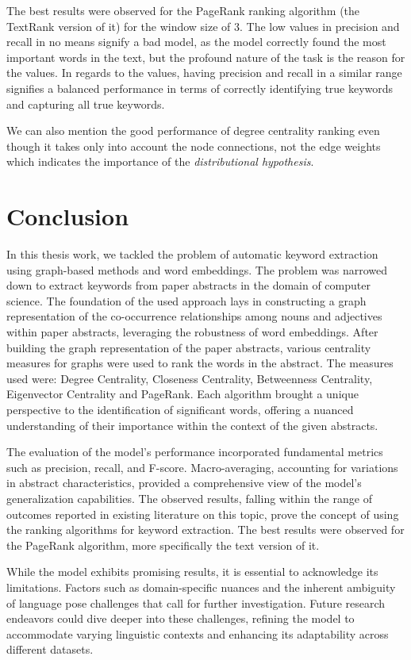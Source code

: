 \documentclass[12pt]{article}
\numberwithin{equation}{section}
\begin{document}
\begin{spacing}{1.5}
	The best results were observed for the PageRank ranking algorithm (the TextRank version of it) for the window size of $3$. The low values in precision and recall in no means signify a bad model, as the model correctly found the most important words in the text, but the profound nature of the task is the reason for the values. In regards to the values, having precision and recall in a similar range signifies a balanced performance in terms of correctly identifying true keywords and capturing all true keywords. 
	
	We can also mention the good performance of degree centrality ranking even though it takes only into account the node connections, not the edge weights which indicates the importance of the \textit{distributional hypothesis}.

	\newpage
	\section{Conclusion}
	In this thesis work, we tackled the problem of automatic keyword extraction using graph-based methods and word embeddings. The problem was narrowed down to extract keywords from paper abstracts in the domain of computer science. The foundation of the used approach lays in constructing a graph representation of the co-occurrence relationships among nouns and adjectives within paper abstracts, leveraging the robustness of word embeddings. After building the graph representation of the paper abstracts, various centrality measures for graphs were used to rank the words in the abstract. The measures used were: Degree Centrality, Closeness Centrality, Betweenness Centrality, Eigenvector Centrality and PageRank. Each algorithm brought a unique perspective to the identification of significant words, offering a nuanced understanding of their importance within the context of the given abstracts.
	
	The evaluation of the model's performance incorporated fundamental metrics such as precision, recall, and F-score. Macro-averaging, accounting for variations in abstract characteristics, provided a comprehensive view of the model's generalization capabilities. The observed results, falling within the range of outcomes reported in existing literature on this topic, prove the concept of using the ranking algorithms for keyword extraction. The best results were observed for the PageRank algorithm, more specifically the text version of it. 
	
	While the model exhibits promising results, it is essential to acknowledge its limitations. Factors such as domain-specific nuances and the inherent ambiguity of language pose challenges that call for further investigation. Future research endeavors could dive deeper into these challenges, refining the model to accommodate varying linguistic contexts and enhancing its adaptability across different datasets.
	

\end{spacing}
\end{document}
